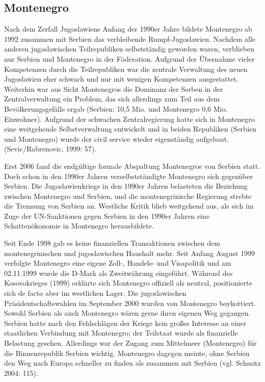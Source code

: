 \subsection{Montenegro}
Nach dem Zerfall Jugoslawiens Anfang der 1990er Jahre bildete Montenegro ab 1992 zusammen mit Serbien das verbleibende Rumpf-Jugoslawien. Nachdem alle anderen jugoslawischen Teilrepubliken selbstständig geworden waren, verblieben nur Serbien und Montenegro in der Föderation. Aufgrund der Übernahme vieler Kompetenzen durch die Teilrepubliken war die zentrale Verwaltung des neuen Jugoslawien eher schwach und nur mit wenigen Kompetenzen ausgestattet. Weiterhin war aus Sicht Montenegros die Dominanz der Serben in der Zentralverwaltung ein Problem, das sich allerdings zum Teil aus dem Bevölkerungsgefälle ergab (Serbien: 10,5 Mio. und Montenegro 0,6 Mio. Einwohner). Aufgrund der schwachen Zentralregierung hatte sich in Montenegro eine weitgehende Selbstverwaltung entwickelt und in beiden Republiken (Serbien und Montenegro) wurde der civil service wieder eigenständig aufgebaut. (Sevic/Rabrenovic, 1999: 57).\par
Erst 2006 fand die endgültige formale Abspaltung Montenegros von Serbien statt. Doch schon in den 1990er Jahren verselbstständigte Montenegro sich gegenüber Serbien. Die Jugoslawienkriege in den 1990er Jahren belasteten die Beziehung zwischen Montenegro und Serbien, und die montenegrinische Regierung strebte die Trennung von Serbien an. Westliche Kritik blieb weitgehend aus, als sich im Zuge der UN-Sanktionen gegen Serbien in den 1990er Jahren eine Schattenökonomie in Montenegro herausbildete.\par
Seit Ende 1998 gab es keine finanziellen Transaktionen zwischen dem montenegrinischen und jugoslawischen Haushalt mehr. Seit Anfang August 1999 verfolgte Montenegro eine eigene Zoll-, Handels- und Visapolitik und am 02.11.1999 wurde die D-Mark als Zweitwährung eingeführt. Während des Kosovokrieges (1999) erklärte sich Montenegro offiziell als neutral, positionierte sich de facto aber im westlichen Lager. Die jugoslawischen Präsidentschaftswahlen im September 2000 wurden von Montenegro boykottiert. Sowohl Serbien als auch Montenegro wären gerne ihren eigenen Weg gegangen. Serbien hatte nach den Fehlschlägen der Kriege kein großes Interesse an einer staatlichen Verbindung mit Montenegro; der Teilstaat wurde als finanzielle Belastung gesehen. Allerdings war der Zugang zum Mittelmeer (Montenegro) für die Binnenrepublik Serbien wichtig. Montenegro dagegen meinte, ohne Serbien den Weg nach Europa schneller zu finden als zusammen mit Serbien (vgl. Schmitz 2004: 115).\par
